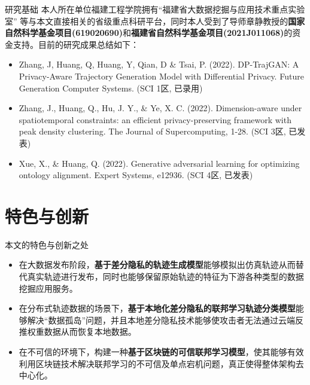 \documentclass{sintefbeamer}
\begin{document}
\begin{frame}{研究基础}
本人所在单位福建工程学院拥有“福建省大数据挖掘与应用技术重点实验室” 等与本文直接相关的省级重点科研平台，同时本人受到了导师章静教授的\textbf{国家自然科学基金项目(619020690)}和\textbf{福建省自然科学基金项目(2021J011068)}的资金支持。目前的研究成果总结如下：
	\begin{itemize}
    	\item Zhang, J, Huang, Q, Huang, Y, Qian, D \& Tsai, P. (2022). DP-TrajGAN: A Privacy-Aware Trajectory Generation Model with Differential Privacy. Future Generation Computer Systems. (SCI 1区, 已录用) 
    	\item Zhang, J., Huang, Q., Hu, J. Y., \& Ye, X. C. (2022). Dimension-aware under spatiotemporal constraints: an efficient privacy-preserving framework with peak density clustering. The Journal of Supercomputing, 1-28. (SCI 3区, 已发表)
    	\item Xue, X., \& Huang, Q. (2022). Generative adversarial learning for optimizing ontology alignment. Expert Systems, e12936. (SCI 4区, 已发表)
   	\end{itemize}
   	
\end{frame}


\section{特色与创新}

\begin{frame}{本文的特色与创新之处}

\begin{itemize}
    \item 在大数据发布阶段，\textbf{基于差分隐私的轨迹生成模型}能够模拟出仿真轨迹从而替代真实轨迹进行发布，同时也能够保留原始轨迹的特征为下游各种类型的数据挖掘应用服务。
    \item 在分布式轨迹数据的场景下，\textbf{基于本地化差分隐私的联邦学习轨迹分类模型}能够解决“数据孤岛”问题，并且本地差分隐私技术能够使攻击者无法通过云端反推权重数据从而恢复本地数据。
    \item 在不可信的环境下，构建一种\textbf{基于区块链的可信联邦学习模型}，使其能够有效利用区块链技术解决联邦学习的不可信及单点宕机问题，真正使得整体架构去中心化。
  \end{itemize}
\end{frame}



\backmatter
\end{document}
